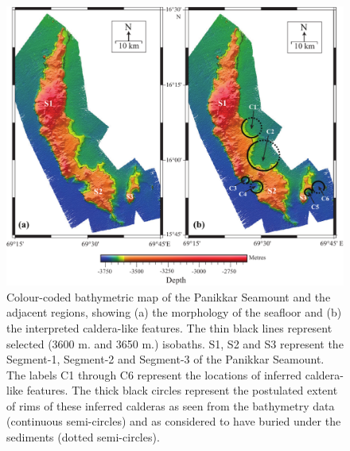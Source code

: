\documentclass[twocolumn]{article}
\begin{document}
\begin{figure}[!htb]
	\centering
	\includegraphics[width=\textwidth]{panikkar-seamount.pdf}
	\caption{
		Colour-coded bathymetric map of the Panikkar Seamount and the adjacent regions, showing (a) the morphology of the seafloor and (b) the interpreted caldera-like features. The thin black lines represent selected (3600 m. and 3650 m.) isobaths. S1, S2 and S3 represent the Segment-1, Segment-2 and Segment-3 of the Panikkar Seamount. The labels C1 through C6 represent the locations of inferred caldera-like features. The thick black circles represent the postulated extent of rims of these inferred calderas as seen from the bathymetry data (continuous semi-circles) and as considered to have buried under the sediments (dotted semi-circles).
	}
	\label{panikkar}
\end{figure}
\end{document}
